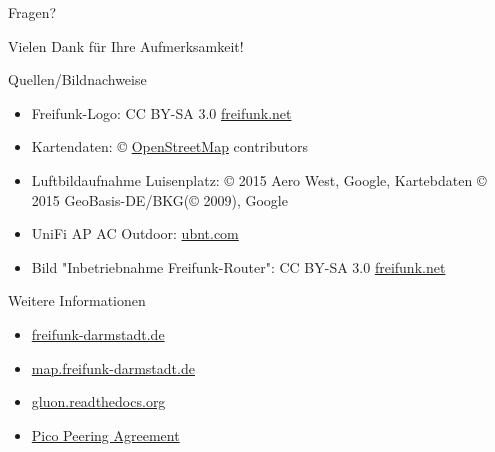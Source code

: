 \documentclass{beamer}
\begin{document}
\begin{frame}
\begin{center}
\Huge Fragen?
\end{center}
\end{frame}


\begin{frame}
\begin{center}
\Huge Vielen Dank für Ihre Aufmerksamkeit!
\end{center}
\end{frame}

\begin{frame}{Quellen/Bildnachweise}
\begin{itemize}
	\item Freifunk-Logo: CC BY-SA 3.0 \href{http://freifunk.net}{freifunk.net}
	\item Kartendaten: © \href{http://openstreetmap.org}{OpenStreetMap} contributors
	\item Luftbildaufnahme Luisenplatz: © 2015 Aero West, Google, Kartebdaten © 2015 GeoBasis-DE/BKG(© 2009), Google
	\item UniFi AP AC Outdoor:  \href{ubnt.com}{ubnt.com}
	\item Bild "Inbetriebnahme Freifunk-Router": CC BY-SA 3.0 \href{http://freifunk.net}{freifunk.net}
\end{itemize}
\end{frame}

\begin{frame}{Weitere Informationen}
\begin{itemize}
	\item \href{http://freifunk-darmstadt.de}{freifunk-darmstadt.de}
	\item \href{http://map.freifunk-darmstadt.de}{map.freifunk-darmstadt.de}
	\item \href{http://gluon.readthedocs.org}{gluon.readthedocs.org}
	\item \href{http://paderborn.freifunk.net/?page_id=42}{Pico Peering Agreement}
\end{itemize}
\end{frame}
\end{document}
